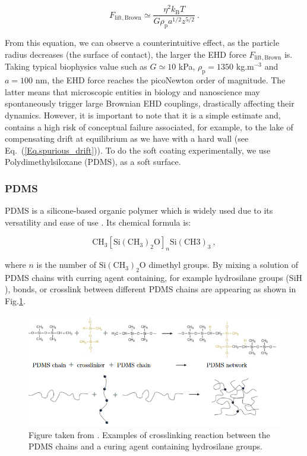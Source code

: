 \begin{equation}
	F_\mathrm{lift, Brown} \simeq \frac{\eta ^2 k_\mathrm{B}T}{G\rho_\mathrm{p} a^{1/2} z^{5/2}} ~.
	\label{Eq.lift_brown}
\end{equation}


From this equation, we can observe a counterintuitive effect, as the particle radius decreases (the surface of contact), the larger the \gls{EHD} force $F_\mathrm{lift, Brown}$ is. Taking typical biophysics value such as $G \simeq 10$ kPa, $\rho_\mathrm{p} = 1350$ kg.m$^{-3}$ and $a=100$ nm, the \gls{EHD} force reaches the picoNewton order of magnitude. The latter means that microscopic entities in biology and nanoscience may spontaneously trigger large Brownian \gls{EHD} couplings, drastically affecting their dynamics. However, it is important to note that it is a simple estimate and, contains a high risk of conceptual failure associated, for example, to the lake of compensating drift at equilibrium as we have with a hard wall (see Eq.~(\ref{Eq.spurious_drift})). To do the soft coating experimentally, we use Polydimethylsiloxane (\gls{PDMS}), as a soft surface.

\subsubsection{PDMS}

\gls{PDMS} is a silicone-based organic polymer which is widely used due to its versatility and ease of use \cite{wolf_pdms_2018}. Its chemical formula is:

\begin{equation}
	\mathrm{CH_3[Si(CH_3)_2 O]}_n \mathrm{Si(CH3)_3} ~,
\end{equation}

where $n$ is the number of $\mathrm{Si(CH_3)_2 O}$ dimethyl groups. By mixing a solution of \gls{PDMS} chains with curring agent containing, for example hydrosilane groups ($\mathrm{SiH}$), bonds, or crosslink between different \gls{PDMS} chains are appearing as shown in Fig.\ref{fig.crosslink}.




\begin{figure}[H]
	\centering
	\includegraphics[scale = 0.8]{02_body/chapter4/images/EHD_forces/figure_cross.png}
	\caption{Figure taken from \cite{tucher_analysis_2016}. Examples of crosslinking reaction between the \gls{PDMS} chains and a curing agent containing hydrosilane groups.}
	\label{fig.crosslink}
\end{figure}


